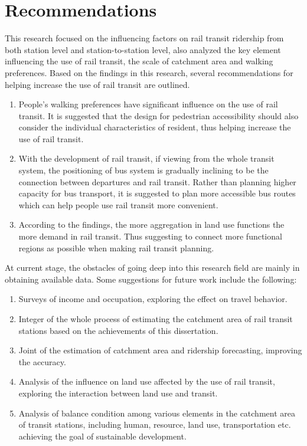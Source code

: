 \section{Recommendations}
This research focused on the influencing factors on rail transit ridership from both station level and station-to-station level, also analyzed the key element influencing the use of rail transit, the scale of catchment area and walking preferences. Based on the findings in this research, several recommendations for helping increase the use of rail transit are outlined.

%
\begin{enumerate}
	\item People's walking preferences have significant influence on the use of rail transit. It is suggested that the design for pedestrian accessibility should also consider the individual characteristics of resident, thus helping increase the use of rail transit.
	
	\item With the development of rail transit, if viewing from the whole transit system, the positioning of bus system is gradually inclining to be the connection between departures and rail transit. Rather than planning higher capacity for bus transport, it is suggested to plan more accessible bus routes which can help people use rail transit more convenient.
	
	\item According to the findings, the more aggregation in land use functions the more demand in rail transit. Thus suggesting to connect more functional regions as possible when making rail transit planning.
\end{enumerate}

At current stage, the obstacles of going deep into this research field are mainly in obtaining available data. Some suggestions for future work include the following:

\begin{enumerate}
	\item Surveys of income and occupation, exploring the effect on travel behavior.
	
	\item Integer of the whole process of estimating the catchment area of rail transit stations based on the achievements of this dissertation.
	
	\item Joint of the estimation of catchment area and ridership forecasting, improving the accuracy.
	
	\item Analysis of the influence on land use affected by the use of rail transit, exploring the interaction between land use and transit.
	
	\item Analysis of balance condition among various elements in the catchment area of transit stations, including human, resource, land use, transportation etc. achieving the goal of sustainable development.
\end{enumerate}

\clearpage %

% 
% 